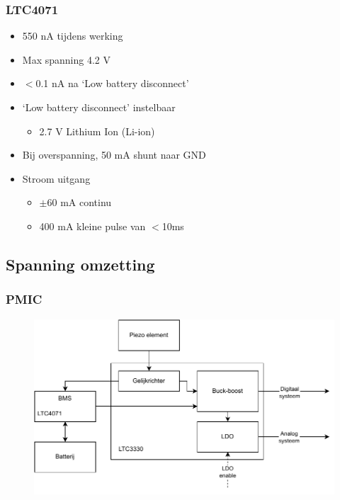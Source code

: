     \begin{frame}
        \frametitle{LTC4071}
        \begin{itemize}
            \item 550 nA tijdens werking
            \item Max spanning 4.2 V
            \item $<$0.1 nA na `Low battery disconnect'
            \item `Low battery disconnect' instelbaar
                \begin{itemize}
                    \item 2.7 V Lithium Ion (Li-ion)
                \end{itemize}
            \item Bij overspanning, 50 mA shunt naar GND
            \item Stroom uitgang
                \begin{itemize}
                    \item $\pm 60$ mA continu 
                    \item 400 mA kleine pulse van $<$10ms
                \end{itemize}
        \end{itemize}

    \end{frame}

    \subsection{Spanning omzetting}

    \begin{frame}
        \frametitle{PMIC}
        \begin{figure}[h]
            \centering
            \includegraphics[scale=0.6]{img/energie_systeem.pdf}
        \end{figure}
    \end{frame}

